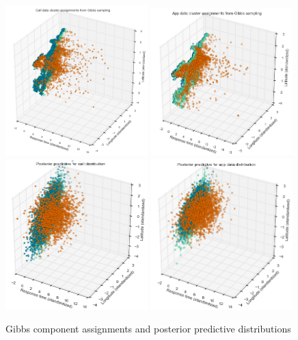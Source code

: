 \documentclass[twoside]{article}
\theoremstyle{theorem}
\theoremstyle{theorem}
\theoremstyle{theorem}
\theoremstyle{lemma}
\theoremstyle{definition}
\theoremstyle{example}
\begin{document}
\begin{figure}
\begin{center}
\includegraphics[width=55mm]{gibbscallclusterassignments}
\includegraphics[width=55mm]{gibbsappclusterassignments}
\includegraphics[width=55mm]{callposteriorpredictive}
\includegraphics[width=55mm]{appposteriorpredictive}
\caption{Gibbs component assignments and posterior predictive distributions}
\label{gibbsclusters}
\end{center}
\end{figure}
\end{document}
